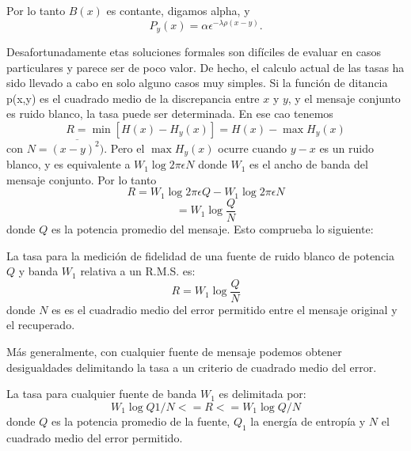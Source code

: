Por lo tanto $B(x)$ es contante, digamos alpha, y
\begin{equation} P_{y}(x) = \alpha \epsilon^{ -\lambda \rho(x - y)}. \end{equation}
			
Desafortunadamente etas soluciones formales son dif\'iciles de evaluar
en casos particulares y parece ser de poco valor. De hecho, el calculo
actual de las tasas ha sido llevado a cabo en solo alguno casos muy
simples.  Si la funci\'on de ditancia p(x,y) es el cuadrado medio de
la discrepancia entre $x$ y $y$, y el mensaje conjunto es ruido
blanco, la tasa puede ser determinada. En ese cao tenemos
\begin{equation} R = \min[ H(x) - H_{y}(x)] = H(x) - \max H_{y}(x) 
\end{equation}
con $N = \overline{(x-y)^{2})}$. Pero el $\max H_{y}(x)$ ocurre cuando
$y - x$ es un ruido blanco, y es equivalente a $W_{1} \log 2 \pi
\epsilon N$ donde $W_{1}$ es el ancho de banda del mensaje conjunto.
Por lo tanto
\begin{equation} R = W_{1} \log 2 \pi \epsilon Q - W_{1} \log 2 \pi \epsilon N \end{equation}
\begin{equation} = W_{1} \log \frac{Q}{N} \end{equation}
donde $Q$ es la potencia promedio del mensaje. Esto comprueba lo
siguiente:

\begin{theorem}
La tasa para la medici\'on de fidelidad de una fuente de ruido blanco
de potencia $Q$ y banda $W_{1}$ relativa a un R.M.S. es:
\begin{equation} R = W_{1} \log \frac{Q}{N} \end{equation}
donde $N$ es es el cuadradio medio del error permitido entre el
mensaje original y el recuperado.
\end{theorem}

M\'as generalmente, con cualquier fuente de mensaje podemos obtener
desigualdades delimitando la tasa a un criterio de cuadrado medio del
error.

\begin{theorem}
La tasa para cualquier fuente de banda $W_{1}$ es delimitada por:
\begin{equation} W_{1} \log Q1/N <= R <= W_{1} \log Q/N \end{equation}
donde $Q$ es la potencia promedio de la fuente, $Q_{1}$ la energ\'ia
de entrop\'ia y $N$ el cuadrado medio del error permitido.
\end{theorem}

